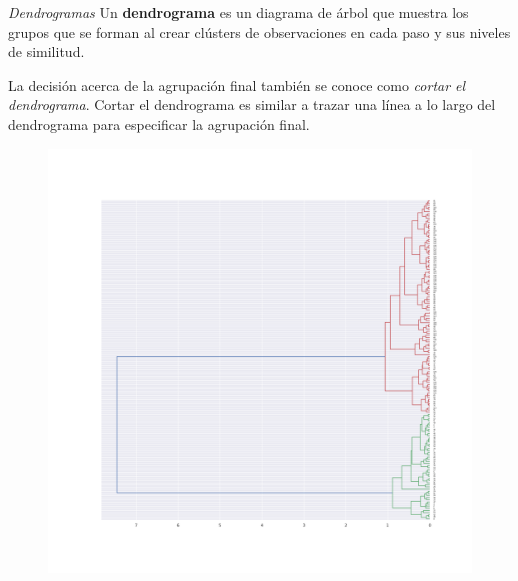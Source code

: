 \documentclass[spanish]{beamer}
\begin{document}
\begin{frame}{\textit{Dendrogramas}}
Un \textbf{dendrograma} es un diagrama de árbol que muestra los grupos que se forman al crear clústers de observaciones en cada paso y sus niveles de similitud.\break

La decisión acerca de la agrupación final también se conoce como \textit{cortar el dendrograma}. Cortar el dendrograma es similar a trazar una línea a lo largo del dendrograma para especificar la agrupación final.
\end{frame}

\begin{frame}
\begin{figure}[h]
\centering
\includegraphics[scale=0.24]{dani/dendrogramAggClusterIRIS.png}
\end{figure}
\end{frame}
\end{document}
